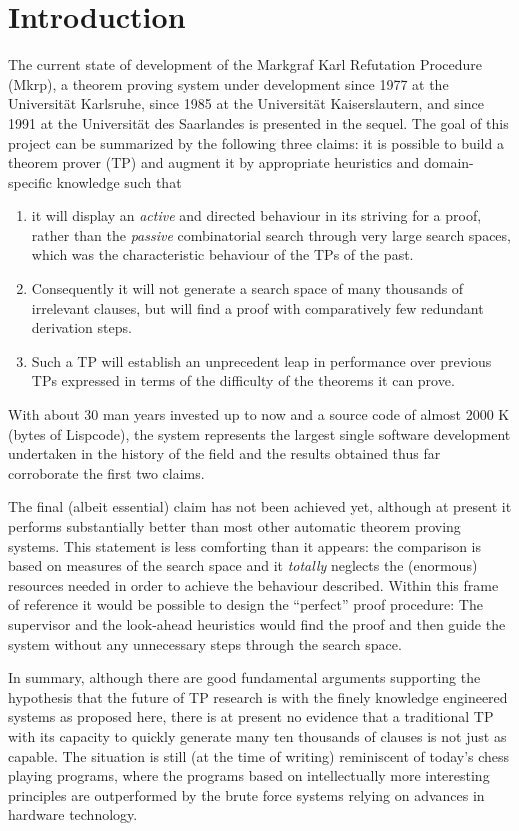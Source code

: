 \chapter{Introduction}

The current state of development of the {\sc Markgraf Karl Refutation
 Procedure} ({\sc Mkrp}), a theorem 
proving system under development since 1977 at the Universit\"at Karlsruhe, 
since 1985 at the Universit\"at Kaisers\-lautern, and since 1991 at 
the Universit\"at des Saarlandes is 
presented in the sequel. The goal of this project can be summarized by 
the following 
three claims: it is possible to build a theorem prover (TP) and augment 
it by appropriate heuristics  and 
domain-specific knowledge such that
\begin{enumerate}
	\item	it will display an {\em active\/} and directed behaviour 
in its striving for a proof, 
rather than the {\em passive\/} combinatorial search through very large search 
spaces, which was the characteristic behaviour of the TPs of the past. 
	\item	Consequently it will not generate a search space of many 
thousands of irrelevant 	
	clauses, but will find a proof with comparatively few redundant
	derivation steps.
	\item	Such a TP will establish an unprecedent 
leap in performance over previous TPs expressed in terms of the difficulty 
of the theorems it can prove.
\end{enumerate}
With about 30 man years invested up to now and a source code of almost 2000 
K (bytes of Lispcode), 
the system represents the largest single software development undertaken in 
the history of the field and 
the results obtained thus far corroborate the first two claims.

The final (albeit essential) claim has not been achieved yet, although
at present it performs substantially better than most other automatic
theorem proving systems.  This statement is less comforting than it
appears: the comparison is based on measures of the search space and
it {\em totally\/} neglects the (enormous) resources needed in order
to achieve the behaviour described. Within this frame of reference it
would be possible to design the ``perfect'' proof procedure: The
supervisor and the look-ahead heuristics would find the proof and then
guide the system without any unnecessary steps through the search
space.

In summary, although there are good fundamental arguments supporting
the hypothesis that the future of TP research is with the finely
knowledge engineered systems as proposed here, there is at present no
evidence that a traditional TP with its capacity to quickly generate
many ten thousands of clauses is not just as capable. The situation is
still (at the time of writing) reminiscent of today's chess playing
programs, where the programs based on intellectually more interesting
principles are outperformed by the brute force systems relying on
advances in hardware technology.

